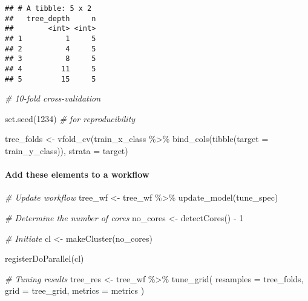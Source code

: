 \documentclass[
]{book}
\newenvironment{Shaded}{\begin{snugshade}}{\end{snugshade}}
\newcommand{\AttributeTok}[1]{\textcolor[rgb]{0.77,0.63,0.00}{#1}}
\newcommand{\CommentTok}[1]{\textcolor[rgb]{0.56,0.35,0.01}{\textit{#1}}}
\newcommand{\DecValTok}[1]{\textcolor[rgb]{0.00,0.00,0.81}{#1}}
\newcommand{\FunctionTok}[1]{\textcolor[rgb]{0.00,0.00,0.00}{#1}}
\newcommand{\NormalTok}[1]{#1}
\newcommand{\OtherTok}[1]{\textcolor[rgb]{0.56,0.35,0.01}{#1}}
\newcommand{\SpecialCharTok}[1]{\textcolor[rgb]{0.00,0.00,0.00}{#1}}
\begin{document}
\begin{verbatim}
## # A tibble: 5 x 2
##   tree_depth     n
##        <int> <int>
## 1          1     5
## 2          4     5
## 3          8     5
## 4         11     5
## 5         15     5
\end{verbatim}

\begin{Shaded}
\begin{Highlighting}[]
\CommentTok{\# 10{-}fold cross{-}validation}

\FunctionTok{set.seed}\NormalTok{(}\DecValTok{1234}\NormalTok{) }\CommentTok{\# for reproducibility }

\NormalTok{tree\_folds }\OtherTok{\textless{}{-}} \FunctionTok{vfold\_cv}\NormalTok{(train\_x\_class }\SpecialCharTok{\%\textgreater{}\%} \FunctionTok{bind\_cols}\NormalTok{(}\FunctionTok{tibble}\NormalTok{(}\AttributeTok{target =}\NormalTok{ train\_y\_class)),}
                       \AttributeTok{strata =}\NormalTok{ target)}
\end{Highlighting}
\end{Shaded}

\hypertarget{add-these-elements-to-a-workflow-1}{%
\paragraph{Add these elements to a workflow}\label{add-these-elements-to-a-workflow-1}}

\begin{Shaded}
\begin{Highlighting}[]
\CommentTok{\# Update workflow }
\NormalTok{tree\_wf }\OtherTok{\textless{}{-}}\NormalTok{ tree\_wf }\SpecialCharTok{\%\textgreater{}\%} \FunctionTok{update\_model}\NormalTok{(tune\_spec)}

\CommentTok{\# Determine the number of cores}
\NormalTok{no\_cores }\OtherTok{\textless{}{-}} \FunctionTok{detectCores}\NormalTok{() }\SpecialCharTok{{-}} \DecValTok{1}

\CommentTok{\# Initiate}
\NormalTok{cl }\OtherTok{\textless{}{-}} \FunctionTok{makeCluster}\NormalTok{(no\_cores)}

\FunctionTok{registerDoParallel}\NormalTok{(cl)}

\CommentTok{\# Tuning results }
\NormalTok{tree\_res }\OtherTok{\textless{}{-}}\NormalTok{ tree\_wf }\SpecialCharTok{\%\textgreater{}\%}
  \FunctionTok{tune\_grid}\NormalTok{(}
    \AttributeTok{resamples =}\NormalTok{ tree\_folds, }
    \AttributeTok{grid =}\NormalTok{ tree\_grid,}
    \AttributeTok{metrics =}\NormalTok{ metrics}
\NormalTok{  )}
\end{Highlighting}
\end{Shaded}
\end{document}
